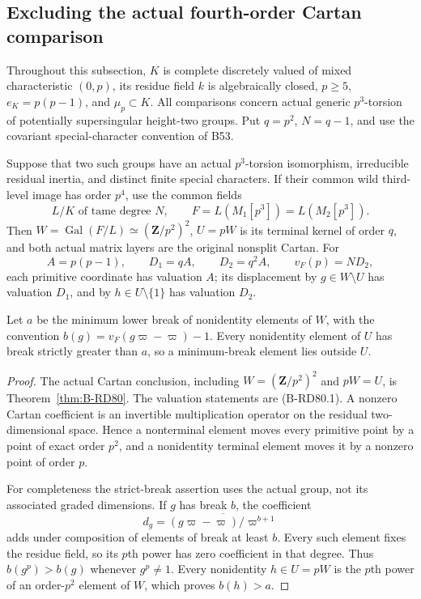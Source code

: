 \subsection{Excluding the actual fourth-order Cartan comparison}

Throughout this subsection, \(K\) is complete discretely valued of
mixed characteristic \((0,p)\), its residue field \(k\) is
algebraically closed, \(p\ge5\), \(e_K=p(p-1)\), and
\(\mu_p\subset K\). All comparisons concern actual generic
\(p^3\)-torsion of potentially supersingular height-two groups.
Put \(q=p^2\), \(N=q-1\), and use the covariant special-character
convention of B53.

\begin{lemma}
\label{lem:B-RD81-levels}
Suppose that two such groups have an actual \(p^3\)-torsion
isomorphism, irreducible residual inertia, and distinct finite
special characters. If their common wild third-level image has
order \(p^4\), use the common fields
\[
 L/K\text{ of tame degree }N,\qquad
 F=L(M_1[p^3])=L(M_2[p^3]).
\]
Then \(W=\operatorname{Gal}(F/L)\simeq(\mathbf Z/p^2)^2\),
\(U=pW\) is its terminal kernel of order \(q\), and both actual
matrix layers are the original nonsplit Cartan. For
\[
 A=p(p-1),\qquad D_1=qA,\qquad D_2=q^2A,
 \qquad v_F(p)=ND_2,                                  \tag{B-RD81.1}
\]
each primitive coordinate has valuation \(A\); its displacement
by \(g\in W\setminus U\) has valuation \(D_1\), and by
\(h\in U\setminus\{1\}\) has valuation \(D_2\).

Let \(a\) be the minimum lower break of nonidentity elements
of \(W\), with the convention
\(b(g)=v_F(g\varpi-\varpi)-1\). Every nonidentity element
of \(U\) has break strictly greater than \(a\), so a
minimum-break element lies outside \(U\).
\end{lemma}
\begin{proof}
The actual Cartan conclusion, including \(W=(\mathbf Z/p^2)^2\)
and \(pW=U\), is Theorem~\ref{thm:B-RD80}. The valuation
statements are (B-RD80.1). A nonzero Cartan coefficient is an
invertible multiplication operator on the residual two-dimensional
space. Hence a nonterminal element moves every primitive point
by a point of exact order \(p^2\), and a nonidentity terminal
element moves it by a nonzero point of order \(p\).

For completeness the strict-break assertion uses the actual
group, not its associated graded dimensions. If \(g\) has
break \(b\), the coefficient
\[
 d_g=\overline{(g\varpi-\varpi)/\varpi^{b+1}}
\]
adds under composition of elements of break at least \(b\).
Every such element fixes the residue field, so its \(p\)th
power has zero coefficient in that degree. Thus
\(b(g^p)>b(g)\) whenever \(g^p\ne1\). Every nonidentity
\(h\in U=pW\) is the \(p\)th power of an order-\(p^2\)
element of \(W\), which proves \(b(h)>a\).
\end{proof}


